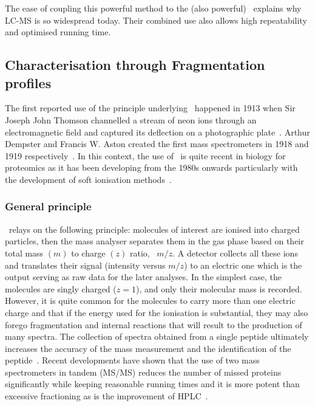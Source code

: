 \vspace{-0.5mm}
The ease of coupling this powerful method to the (also powerful) \ms\ explains
why \gls{LC-MS} is so widespread today. Their combined use also allows high
repeatability and optimised running time.\mybr\
\vspace{-1mm}

\subsection{Characterisation through Fragmentation profiles}
\vspace{-3mm}

The first reported use of the principle underlying \ms\ happened in 1913 when
Sir Joseph John Thomson channelled a stream of neon ions through an electromagnetic
field and captured its deflection on a photographic plate~\mycite{Thomson1913}.
Arthur Dempster and Francis W. Aston created the first mass spectrometers in 1918
and 1919 respectively~\mycite{Aston1919}.
In this context, the use of \ms\ is quite recent in biology for proteomics
as it has been developing from the 1980s onwards
particularly with the development of soft ionisation methods~.\mybr\

\subsubsection{General principle}

\ms\ relays on the following principle: molecules of interest are ionised
into charged particles, then the mass analyser separates them in the gas phase
based on their total mass $(m)$ to charge $(z)$ ratio, \ie\ $m/z$.
A detector collects all these ions and translates their signal (intensity versus
$m/z$) to an electric one which is the output serving as raw data for the
later analyses. In the simplest case, the molecules are singly charged ($z=1$),
and only their molecular mass is recorded. However, it is quite common for the
molecules to carry more than one electric charge and that if the energy used for
the ionisation is substantial, they may also forego fragmentation and internal
reactions that will result to the production of many spectra.
The collection of spectra obtained from a single peptide ultimately increases the accuracy of
the mass measurement and the identification of the peptide~\mycite{BiomolBio}.
Recent developments have
shown that the use of two mass spectrometers in tandem (\gls{MS/MS}) reduces
the number of missed proteins significantly while keeping reasonable running
times and it is more potent than excessive fractioning as is the improvement
of \gls{HPLC}~\mycite{Cox2011}.\mybr\


